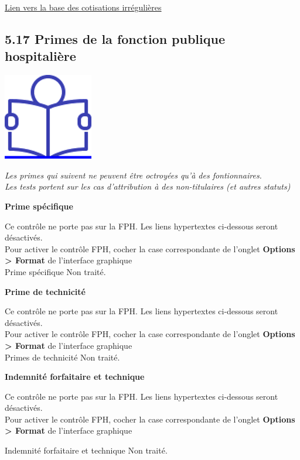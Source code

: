 \href{../Bases/Reglementation/Cotisations.irreg.ircantec.csv}{Lien vers la
base des cotisations irrégulières}

\hypertarget{primes-de-la-fonction-publique-hospitaliere}{%
\subsection{5.17 Primes de la fonction publique
hospitalière}\label{primes-de-la-fonction-publique-hospitaliere}}

\href{../Docs/Notices/fiche_FPH.odt}{\includegraphics{icones/Notice.png}}

\emph{Les primes qui suivent ne peuvent être octroyées qu'à des
fontionnaires.}\\
\emph{Les tests portent sur les cas d'attribution à des non-titulaires
(et autres statuts)}

\textbf{Prime spécifique}

Ce contrôle ne porte pas sur la FPH. Les liens hypertextes ci-dessous
seront désactivés.\\
Pour activer le contrôle FPH, cocher la case correspondante de l'onglet
\textbf{Options \textgreater{} Format} de l'interface graphique\\
Prime spécifique Non traité.

\textbf{Prime de technicité}

Ce contrôle ne porte pas sur la FPH. Les liens hypertextes ci-dessous
seront désactivés.\\
Pour activer le contrôle FPH, cocher la case correspondante de l'onglet
\textbf{Options \textgreater{} Format} de l'interface graphique\\
Primes de technicité Non traité.

\textbf{Indemnité forfaitaire et technique}

Ce contrôle ne porte pas sur la FPH. Les liens hypertextes ci-dessous
seront désactivés.\\
Pour activer le contrôle FPH, cocher la case correspondante de l'onglet
\textbf{Options \textgreater{} Format} de l'interface graphique

Indemnité forfaitaire et technique Non traité.


